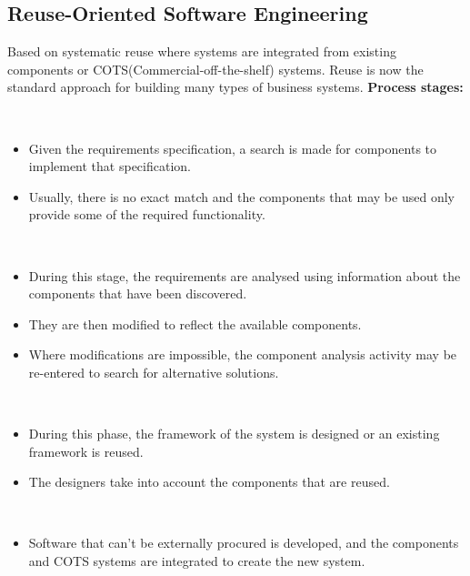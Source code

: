 \documentclass{article}
\begin{document}
\subsection{Reuse-Oriented Software Engineering}
\vspace{-6pt}
Based on systematic reuse where systems are integrated from existing components or COTS(Commercial-off-the-shelf) systems. Reuse is now the standard approach for building many types of business systems.\newline
\textbf{Process stages:}
\begin{description}
  \setlength\itemsep{-.25em}
  \item [Component analysis] \
  \vspace{-6pt}
  \begin{itemize}
    \setlength\itemsep{-.25em}
    \item Given the requirements specification, a search is made for components to implement that specification.
    \item Usually, there is no exact match and the components that may be used only provide some of the required functionality.
  \end{itemize}
  \item[Requirements modification] \
  \vspace{-6pt}
  \begin{itemize}
  \setlength\itemsep{-.25em}
  \item During this stage, the requirements are analysed using information about the components that have been discovered.
  \item They are then modified to reflect the available components.
  \item Where modifications are impossible, the component analysis activity may be re-entered to search for alternative solutions.
  \end{itemize}
  \item [System design with reuse] \
  \vspace{-6pt}
  \begin{itemize}
  \setlength\itemsep{-.25em}
  \item During this phase, the framework of the system is designed or an existing framework is reused.
  \item The designers take into account the components that are reused.
  \end{itemize}
  \item [Development and integration.] \
  \vspace{-6pt}
  \begin{itemize}
  \setlength\itemsep{-.25em}
   \item Software that can’t be externally procured is developed, and the components and COTS systems are integrated to create the new system.
  \end{itemize}
\end{description}
\end{document}
